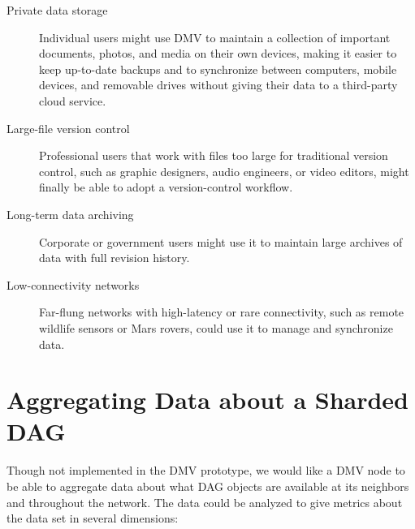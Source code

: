 \begin{description}

    \item[Private data storage] Individual users might use \gls{DMV} to maintain
        a collection of important documents, photos, and media on their own
        devices, making it easier to keep up-to-date backups and to synchronize
        between computers, mobile devices, and removable drives without giving
        their data to a third-party cloud service.

    \item[Large-file version control] Professional users that work with files
        too large for traditional version control, such as graphic designers,
        audio engineers, or video editors, might finally be able to adopt a
        version-control workflow.

    \item[Long-term data archiving] Corporate or government users might use it
        to maintain large archives of data with full revision history.

    \item[Low-connectivity networks] Far-flung networks with high-latency or
        rare connectivity, such as remote wildlife sensors or Mars rovers, could
        use it to manage and synchronize data.

\end{description}

%


\section{Aggregating Data about a Sharded DAG}

Though not implemented in the \gls{DMV} prototype, we would like a \gls{DMV}
node to be able to aggregate data about what \gls{DAG} objects are available at
its neighbors and throughout the network. The data could be analyzed to give
metrics about the data set in several dimensions:

